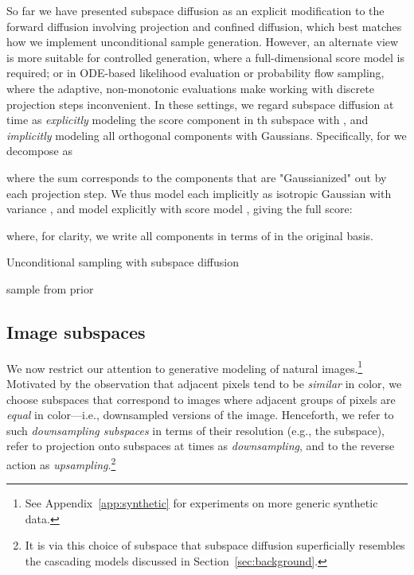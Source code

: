 \documentclass{article}
\begin{document}
So far we have presented subspace diffusion as an explicit modification to the forward diffusion involving projection and confined diffusion, which best matches how we implement unconditional sample generation. However, an alternate view is more suitable for controlled generation, where a full-dimensional score model is required; or in ODE-based likelihood evaluation or probability flow sampling, where the adaptive, non-monotonic evaluations make working with discrete projection steps inconvenient. In these settings, we regard subspace diffusion at time  as \emph{explicitly} modeling the score component in th subspace with , and \emph{implicitly} modeling all orthogonal components with Gaussians. Specifically, for  we decompose  as

where the sum corresponds to the components that are "Gaussianized" out by each projection step. We thus model each  implicitly as isotropic Gaussian with variance , and model  explicitly with score model , giving the full score:

where, for clarity, we write all components in terms of  in the original basis.

\begin{algorithm}[t]
\caption{Unconditional sampling with subspace diffusion}\label{alg:sampling}
 sample from prior \;
\end{algorithm}

\subsection{Image subspaces}

We now restrict our attention to generative modeling of natural images.\footnote{See Appendix~\ref{app:synthetic} for experiments on more generic synthetic data.} Motivated by the observation that adjacent pixels tend to be \emph{similar} in color, we choose subspaces that correspond to images where adjacent groups of pixels are \emph{equal} in color---i.e., downsampled versions of the image. Henceforth, we refer to such \emph{downsampling subspaces} in terms of their resolution (e.g., the  subspace), refer to projection onto subspaces at times  as \emph{downsampling}, and to the reverse action as \emph{upsampling}.\footnote{It is via this choice of subspace that subspace diffusion superficially resembles the cascading models discussed in Section~\ref{sec:background}.}
\end{document}
